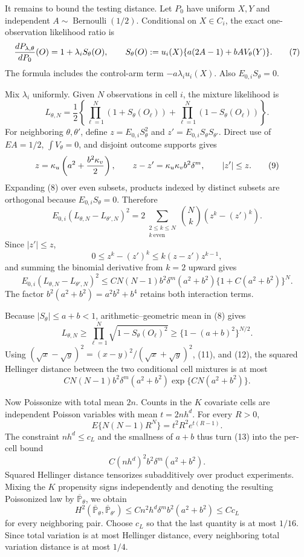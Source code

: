 It remains to bound the testing distance.  Let \(P_0\) have uniform \(X,Y\) and independent \(A\sim\operatorname{Bernoulli}(1/2)\).  Conditional on \(X\in C_i\), the exact one-observation likelihood ratio is
\[
 {dP_{\lambda,\theta}\over dP_0}(O)
 =1+\lambda_iS_\theta(O),\qquad
 S_\theta(O):=u_i(X)\{a(2A-1)+bA V_\theta(Y)\}.
 \tag{7}
\]
The formula includes the control-arm term \(-a\lambda_i u_i(X)\).  Also \(E_{0,i}S_\theta=0\).

Mix \(\lambda_i\) uniformly.  Given \(N\) observations in cell \(i\), the mixture likelihood is
\[
 L_{\theta,N}=\frac12\left\{\prod_{\ell=1}^N(1+S_\theta(O_\ell))
                      +\prod_{\ell=1}^N(1-S_\theta(O_\ell))\right\}.
 \tag{8}
\]
For neighboring \(\theta,\theta'\), define \(z=E_{0,i}S_\theta^2\) and \(z'=E_{0,i}S_\theta S_{\theta'}\).  Direct use of \(E A=1/2\), \(\int V_\theta=0\), and disjoint outcome supports gives
\[
 z=\kappa_u\left(a^2+{b^2\kappa_v\over2}\right),\qquad
 z-z'=\kappa_u\kappa_v b^2\delta^m,\qquad |z'|\leq z.
 \tag{9}
\]
Expanding (8) over even subsets, products indexed by distinct subsets are orthogonal because \(E_{0,i}S_\theta=0\).  Therefore
\[
 E_{0,i}(L_{\theta,N}-L_{\theta',N})^2
 =2\sum_{\substack{2\leq k\leq N\\ k\ \mathrm{even}}}{N\choose k}(z^k-(z')^k).
 \tag{10}
\]
Since \(|z'|\leq z\),
\[
 0\leq z^k-(z')^k\leq k(z-z')z^{k-1},
\]
and summing the binomial derivative from \(k=2\) upward gives
\[
 E_{0,i}(L_{\theta,N}-L_{\theta',N})^2
 \leq C N(N-1)b^2\delta^m(a^2+b^2)
          \{1+C(a^2+b^2)\}^{N}.
 \tag{11}
\]
The factor \(b^2(a^2+b^2)=a^2b^2+b^4\) retains both interaction terms.

Because \(|S_\theta|\leq a+b<1\), arithmetic--geometric mean in (8) gives
\[
 L_{\theta,N}\geq
 \prod_{\ell=1}^N\sqrt{1-S_\theta(O_\ell)^2}
 \geq\{1-(a+b)^2\}^{N/2}.
 \tag{12}
\]
Using \((\sqrt x-\sqrt y)^2=(x-y)^2/(\sqrt x+\sqrt y)^2\), (11), and (12), the squared Hellinger distance between the two conditional cell mixtures is at most
\[
 C N(N-1)b^2\delta^m(a^2+b^2)
       \exp\{CN(a^2+b^2)\}.
 \tag{13}
\]

Now Poissonize with total mean \(2n\).  Counts in the \(K\) covariate cells are independent Poisson variables with mean \(t=2nh^d\).  For every \(R>0\),
\[
 E\{N(N-1)R^N\}=t^2R^2e^{t(R-1)}.
\]
The constraint \(nh^d\leq c_L\) and the smallness of \(a+b\) thus turn (13) into the per-cell bound
\[
 C( nh^d)^2b^2\delta^m(a^2+b^2).
\]
Squared Hellinger distance tensorizes subadditively over product experiments.  Mixing the \(K\) propensity signs independently and denoting the resulting Poissonized law by \(\overline{\mathbb P}_\theta\), we obtain
\[
 H^2(\overline{\mathbb P}_\theta,
     \overline{\mathbb P}_{\theta'})
 \leq Cn^2h^d\delta^m b^2(a^2+b^2)
 \leq Cc_L
 \tag{14}
\]
for every neighboring pair.  Choose \(c_L\) so that the last quantity is at most \(1/16\).  Since total variation is at most Hellinger distance, every neighboring total variation distance is at most \(1/4\).


